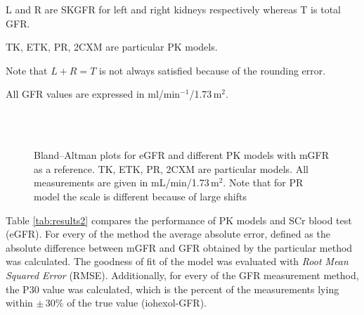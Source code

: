 \begin{landscape}
\begin{table}[H]
\begin{threeparttable}
\begin{tabular}
  \bottomrule

\end{tabular}
\begin{tablenotes}%
\footnotesize{}%
\item L and R are SKGFR for left and right kidneys respectively whereas T is total GFR.
\item TK, ETK, PR, 2CXM are particular PK models. 
\item Note that $L+R = T$ is not always satisfied because of the rounding error.
\item All GFR values are expressed in ml/min$^{-1}$/1.73\,m$^2$.
    \end{tablenotes}
	\end{threeparttable}
\end{table}
\end{landscape}


\begin{figure}[H]
	\centering
	 \\ \vspace{10pt}  
 	 \hfill {} \\ \vspace{10pt}   
	 \hfill {}

\caption[Bland–Altman plots for different methods]{Bland–Altman plots for eGFR and different PK models with mGFR as a reference. TK, ETK, PR, 2CXM are particular models. All measurements are given in mL/min/1.73\,m$^2$. Note that for PR model the scale is different because of large shifts} 
\label{fig:baltman}
\end{figure}

Table \ref{tab:results2} compares the performance of PK models and SCr blood test (eGFR). For every of the method the average absolute error, defined as the absolute difference between mGFR and GFR obtained by the particular method was calculated.
The goodness of fit of the model was evaluated with \textit{Root Mean Squared Error} (RMSE). 
Additionally, for every of the GFR measurement method, the P30 value was calculated, which is the percent of the measurements lying within $\pm\,30\%$ of the true value (iohexol-GFR).


